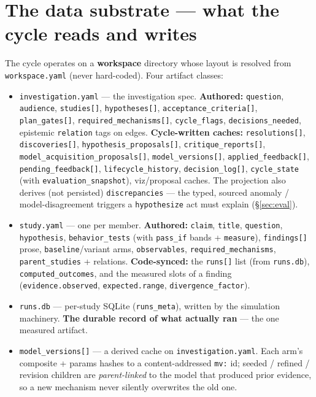 \documentclass[11pt]{article}
\newcommand{\code}[1]{\texttt{\small #1}}
\begin{document}
\section{The data substrate --- what the cycle reads and writes}

The cycle operates on a \textbf{workspace} directory whose layout is resolved from
\code{workspace.yaml} (never hard-coded). Four artifact classes:

\begin{itemize}
\item \code{investigation.yaml} --- the investigation spec. \textbf{Authored:} \code{question},
\code{audience}, \code{studies[]}, \code{hypotheses[]}, \code{acceptance\_criteria[]},
\code{plan\_gates[]}, \code{required\_mechanisms[]}, \code{cycle\_flags}, \code{decisions\_needed},
epistemic \code{relation} tags on edges. \textbf{Cycle-written caches:} \code{resolutions[]},
\code{discoveries[]}, \code{hypothesis\_proposals[]}, \code{critique\_reports[]},
\code{model\_acquisition\_proposals[]}, \code{model\_versions[]}, \code{applied\_feedback[]},
\code{pending\_feedback[]}, \code{lifecycle\_history}, \code{decision\_log[]}, \code{cycle\_state} (with
\code{evaluation\_snapshot}), viz/proposal caches. The projection also derives (not persisted)
\code{discrepancies} --- the typed, sourced anomaly / model-disagreement triggers a
\code{hypothesize} act must explain (\S\ref{sec:eval}).
\item \code{study.yaml} --- one per member. \textbf{Authored:} \code{claim}, \code{title},
\code{question}, \code{hypothesis}, \code{behavior\_tests} (with \code{pass\_if} bands +
\code{measure}), \code{findings[]} prose, \code{baseline}/variant arms, \code{observables},
\code{required\_mechanisms}, \code{parent\_studies} + relations. \textbf{Code-synced:} the
\code{runs[]} list (from \code{runs.db}), \code{computed\_outcomes}, and the measured slots of a
finding (\code{evidence.observed}, \code{expected.range}, \code{divergence\_factor}).
\item \code{runs.db} --- per-study SQLite (\code{runs\_meta}), written by the simulation
machinery. \textbf{The durable record of what actually ran} --- the one measured artifact.
\item \code{model\_versions[]} --- a derived cache on \code{investigation.yaml}. Each arm's
composite + params hashes to a content-addressed \code{mv:} id; seeded / refined / revision
children are \emph{parent-linked} to the model that produced prior evidence, so a new mechanism
never silently overwrites the old one.
\end{itemize}
\end{document}
